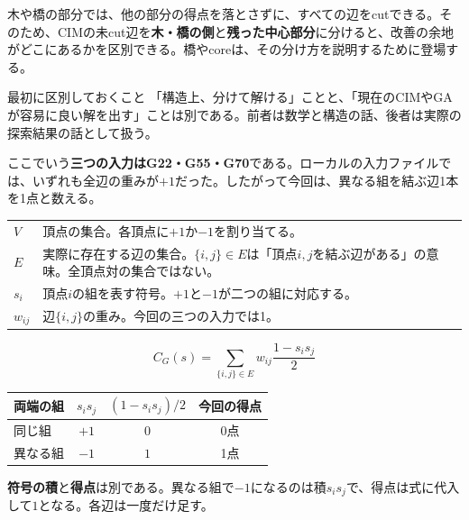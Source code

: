 木や橋の部分では、他の部分の得点を落とさずに、すべての辺をcutできる。そのため、CIMの未cut辺を\textbf{木・橋の側}と\textbf{残った中心部分}に分けると、改善の余地がどこにあるかを区別できる。橋やcoreは、その分け方を説明するために登場する。

\begin{caution}{最初に区別しておくこと}
「構造上、分けて解ける」ことと、「現在のCIMやGAが容易に良い解を出す」ことは別である。前者は数学と構造の話、後者は実際の探索結果の話として扱う。
\end{caution}
\vfill
{}

\newpage
{}
ここでいう\textbf{三つの入力はG22・G55・G70}である。ローカルの入力ファイルでは、いずれも全辺の重みが$+1$だった。したがって今回は、異なる組を結ぶ辺1本を1点と数える。

\noindent\begin{tabularx}{\textwidth}{@{}lX@{}}\toprule
$V$ & 頂点の集合。各頂点に$+1$か$-1$を割り当てる。\\
$E$ & 実際に存在する辺の集合。$\{i,j\}\in E$は「頂点$i,j$を結ぶ辺がある」の意味。全頂点対の集合ではない。\\
$s_i$ & 頂点$i$の組を表す符号。$+1$と$-1$が二つの組に対応する。\\
$w_{ij}$ & 辺$\{i,j\}$の重み。今回の三つの入力では1。\\\bottomrule
\end{tabularx}
\[
C_G(s)=\sum_{\{i,j\}\in E}w_{ij}\frac{1-s_is_j}{2}
\]
\begin{center}
\begin{tabular}{lccc}\toprule
両端の組 & $s_is_j$ & $(1-s_is_j)/2$ & 今回の得点\\\midrule
同じ組 & $+1$ & $0$ & 0点\\
異なる組 & $-1$ & $1$ & 1点\\\bottomrule
\end{tabular}
\end{center}
\textbf{符号の積}と\textbf{得点}は別である。異なる組で$-1$になるのは積$s_is_j$で、得点は式に代入して$1$となる。各辺は一度だけ足す。

